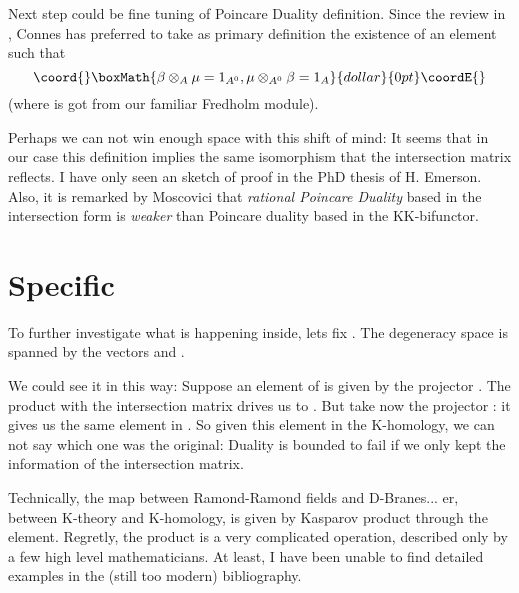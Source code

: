\documentclass[a4paper,10pt]{article}
\begin{document}
Next step could be fine tuning of Poincare Duality definition. Since the 
review in \cite{asterisque}, Connes has preferred to take as primary 
definition the existence of an element \coordHE{} such
that
$$\coord{}\boxMath{ \beta \otimes_A \mu = 1_{A^0},  \mu \otimes_{A^0} \beta = 1_A }{dollar}{0pt}\coordE{}$$ 
(where \coordHE{} is got from our familiar Fredholm module). 

Perhaps we can not win enough space with this shift of mind:
It seems that in our case this definition implies the same isomorphism that the
intersection matrix reflects.   I have only seen an sketch of proof in
the PhD thesis of H. Emerson.  Also, it is remarked by Moscovici that
{\it rational Poincare Duality} based in the intersection form is
{\it weaker} than Poincare  duality based in the KK-bifunctor.


 
\section{Specific}

To further investigate what is happening inside, lets fix \coordHE{}. The
degeneracy space is spanned by the vectors \coordHE{} and
 \coordHE{}.

We could see it in this way: Suppose an element of \coordHE{} is given by
the projector \coordHE{}. The product with the intersection
matrix drives us to \coordHE{}. But take now the projector
\coordHE{}: it gives us the same element \coordHE{} in 
\coordHE{}. So given this element in the K-homology, we can not say
which one was the original: Duality is bounded to fail if we only
kept the information of the intersection matrix.


Technically, the map between Ramond-Ramond fields and D-Branes... er, 
between K-theory and K-homology, is given by Kasparov product through
the \myHighlight{$\mu$}\coordHE{} element. Regretly, the product is a very complicated operation,
described only by a few high level mathematicians. At least, I have 
been unable to find detailed examples in the (still too modern)
bibliography. 
\end{document}

